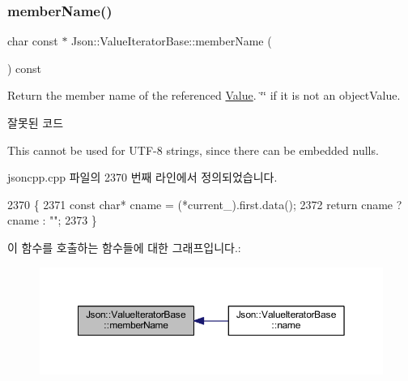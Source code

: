 \subsubsection{\texorpdfstring{member\+Name()}{memberName()}\hspace{0.1cm}{\footnotesize\ttfamily [1/2]}}
{\footnotesize\ttfamily char const  $\ast$ Json\+::\+Value\+Iterator\+Base\+::member\+Name (\begin{DoxyParamCaption}{ }\end{DoxyParamCaption}) const}

Return the member name of the referenced \hyperlink{class_json_1_1_value}{Value}. \char`\"{}\char`\"{} if it is not an object\+Value. \begin{DoxyRefDesc}{잘못된 코드}
\item[\hyperlink{deprecated__deprecated000004}{잘못된 코드}]This cannot be used for U\+T\+F-\/8 strings, since there can be embedded nulls. \end{DoxyRefDesc}


jsoncpp.\+cpp 파일의 2370 번째 라인에서 정의되었습니다.


\begin{DoxyCode}
2370                                                 \{
2371   \textcolor{keyword}{const} \textcolor{keywordtype}{char}* cname = (*current\_).first.data();
2372   \textcolor{keywordflow}{return} cname ? cname : \textcolor{stringliteral}{""};
2373 \}
\end{DoxyCode}
이 함수를 호출하는 함수들에 대한 그래프입니다.\+:
\nopagebreak
\begin{figure}[H]
\begin{center}
\leavevmode
\includegraphics[width=350pt]{class_json_1_1_value_iterator_base_a54765da6759fd3f1edcbfbaf308ec263_icgraph}
\end{center}
\end{figure}
\mbox{\label{class_json_1_1_value_iterator_base_a391c9cbd0edf9a447b37df00e8ce6059}} 
